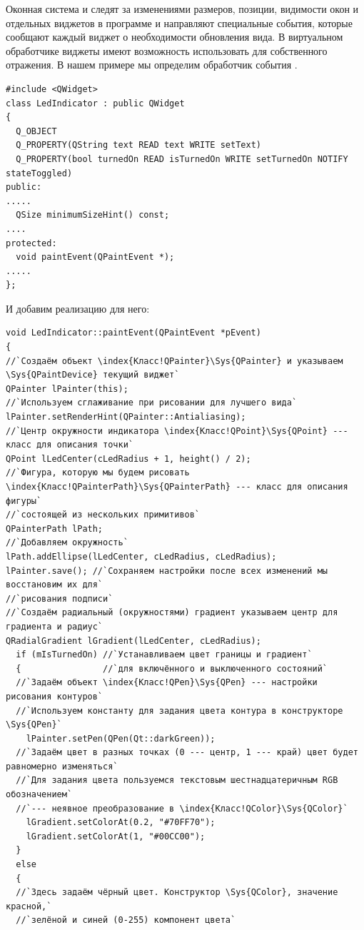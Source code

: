 Оконная система и  следят за изменениями размеров, позиции, видимости окон и отдельных виджетов в программе и
направляют специальные события, которые сообщают каждый виджет о необходимости обновления вида. В виртуальном
обработчике  виджеты имеют возможность использовать  для
собственного отражения. В нашем примере мы определим обработчик события
.
\begin{lstlisting}
#include <QWidget>
class LedIndicator : public QWidget
{
  Q_OBJECT
  Q_PROPERTY(QString text READ text WRITE setText)
  Q_PROPERTY(bool turnedOn READ isTurnedOn WRITE setTurnedOn NOTIFY stateToggled)
public:
.....
  QSize minimumSizeHint() const;
....
protected:
  void paintEvent(QPaintEvent *);
.....
};
\end{lstlisting}
И добавим реализацию для него:
\begin{lstlisting}
void LedIndicator::paintEvent(QPaintEvent *pEvent)
{
//`Создаём объект \index{Класс!QPainter}\Sys{QPainter} и указываем \Sys{QPaintDevice} текущий виджет`
QPainter lPainter(this);
//`Используем сглаживание при рисовании для лучшего вида`
lPainter.setRenderHint(QPainter::Antialiasing);
//`Центр окружности индикатора \index{Класс!QPoint}\Sys{QPoint} --- класс для описания точки`
QPoint lLedCenter(cLedRadius + 1, height() / 2);
//`Фигура, которую мы будем рисовать \index{Класс!QPainterPath}\Sys{QPainterPath} --- класс для описания фигуры`
//`состоящей из нескольких примитивов`
QPainterPath lPath;
//`Добавляем окружность`
lPath.addEllipse(lLedCenter, cLedRadius, cLedRadius);
lPainter.save(); //`Сохраняем настройки после всех изменений мы восстановим их для`
//`рисования подписи`
//`Создаём радиальный (окружностями) градиент указываем центр для градиента и радиус`
QRadialGradient lGradient(lLedCenter, cLedRadius);
  if (mIsTurnedOn) //`Устанавливаем цвет границы и градиент`
  {                //`для включённого и выключенного состояний`
  //`Задаём объект \index{Класс!QPen}\Sys{QPen} --- настройки рисования контуров`
  //`Используем константу для задания цвета контура в конструкторе \Sys{QPen}`
    lPainter.setPen(QPen(Qt::darkGreen));
  //`Задаём цвет в разных точках (0 --- центр, 1 --- край) цвет будет равномерно изменяться`
  //`Для задания цвета пользуемся текстовым шестнадцатеричным RGB обозначением`
  //`--- неявное преобразование в \index{Класс!QColor}\Sys{QColor}`
    lGradient.setColorAt(0.2, "#70FF70");
    lGradient.setColorAt(1, "#00CC00");
  }
  else
  {
  //`Здесь задаём чёрный цвет. Конструктор \Sys{QColor}, значение красной,`
  //`зелёной и синей (0-255) компонент цвета`

\end{lstlisting}

